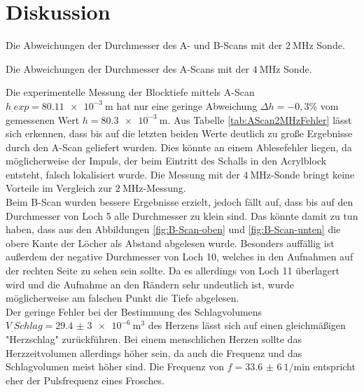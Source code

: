 
\section{Diskussion}
\label{sec:Diskussion}

\begin{table}
	\centering
	\caption{Die Abweichungen der Durchmesser des A- und B-Scans mit der $\SI{2}{\mega\hertz}$ Sonde.}
	
	\label{tab:AScan2MHzFehler}
\end{table}

\begin{table}
	\centering
	\caption{Die Abweichungen der Durchmesser des A-Scans mit der $\SI{4}{\mega\hertz}$ Sonde.}
	
	\label{tab:AScan4MHzFehler}
\end{table}

\noindent Die experimentelle Messung der Blocktiefe mittels A-Scan $h_.{exp}=\SI{80.11e-3}{\metre}$ hat nur eine geringe Abweichung $\Delta h = -0,3 \%$ vom gemessenen Wert $h=\SI{80.3e-3}{\metre}$.
Aus Tabelle \ref{tab:AScan2MHzFehler} lässt sich erkennen, dass bis auf die letzten beiden Werte deutlich zu große Ergebnisse durch den A-Scan geliefert wurden. Dies könnte an einem Ablesefehler liegen, da möglicherweise der Impuls, der beim Eintritt des Schalls in den Acrylblock entsteht, falsch lokalisiert wurde. 
Die Messung mit der $\SI{4}{\mega\hertz}$-Sonde bringt keine Vorteile im Vergleich zur
$\SI{2}{\mega\hertz}$-Messung.\\
Beim B-Scan wurden bessere Ergebnisse erzielt, jedoch fällt auf, dass bis auf den Durchmesser von Loch 5 alle Durchmesser zu klein sind. Das könnte damit zu tun haben, dass aus den Abbildungen \ref{fig:B-Scan-oben} und \ref{fig:B-Scan-unten} die obere Kante der Löcher als Abstand abgelesen wurde. Besonders auffällig ist außerdem der negative Durchmesser von Loch 10, welches in den Aufnahmen auf der rechten Seite zu sehen sein sollte. Da es allerdings von Loch 11 überlagert wird und die Aufnahme an den Rändern sehr undeutlich ist, wurde möglicherweise am falschen Punkt die Tiefe abgelesen.\\
Der geringe Fehler bei der Bestimmung des Schlagvolumens $V_.{Schlag}=\SI{29,4(3)e-6}{\cubic\metre}$ des Herzens lässt sich auf einen gleichmäßigen "Herzschlag" zurückführen. Bei einem menschlichen Herzen sollte das Herzzeitvolumen allerdings höher sein, da auch die Frequenz und das Schlagvolumen meist höher sind. Die Frequenz von $f=\SI{33,6(6)}{1\per\minute}$ entspricht eher der Pulsfrequenz eines Frosches.
